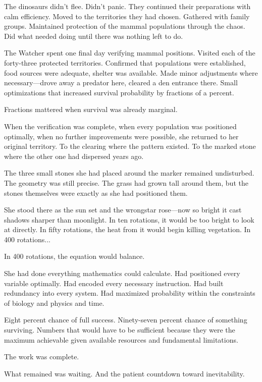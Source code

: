 The dinosaurs didn't flee. Didn't panic. They continued their preparations with calm efficiency. Moved to the territories they had chosen. Gathered with family groups. Maintained protection of the mammal populations through the chaos. Did what needed doing until there was nothing left to do.

The Watcher spent one final day verifying mammal positions. Visited each of the forty-three protected territories. Confirmed that populations were established, food sources were adequate, shelter was available. Made minor adjustments where necessary—drove away a predator here, cleared a den entrance there. Small optimizations that increased survival probability by fractions of a percent.

Fractions mattered when survival was already marginal.

When the verification was complete, when every population was positioned optimally, when no further improvements were possible, she returned to her original territory. To the clearing where the pattern existed. To the marked stone where the other one had dispersed years ago.

The three small stones she had placed around the marker remained undisturbed. The geometry was still precise. The grass had grown tall around them, but the stones themselves were exactly as she had positioned them.

She stood there as the sun set and the wrongstar rose—now so bright it cast shadows sharper than moonlight. In ten rotations, it would be too bright to look at directly. In fifty rotations, the heat from it would begin killing vegetation. In 400 rotations...

In 400 rotations, the equation would balance.

She had done everything mathematics could calculate. Had positioned every variable optimally. Had encoded every necessary instruction. Had built redundancy into every system. Had maximized probability within the constraints of biology and physics and time.

Eight percent chance of full success. Ninety-seven percent chance of something surviving. Numbers that would have to be sufficient because they were the maximum achievable given available resources and fundamental limitations.

The work was complete.

What remained was waiting. And the patient countdown toward inevitability.

\scenebreak

